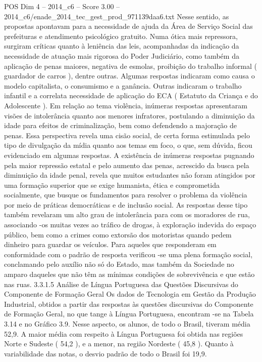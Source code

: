 \begin{textsample}{POS Dim 4 – 2014\_c6 – Score 3.00 – 2014\_c6/enade\_2014\_tec\_gest\_prod\_971139daa6.txt}
Nesse sentido, as propostas apontavam para a necessidade de ajuda da Área de Serviço Social das prefeituras e atendimento psicológico gratuito.
Numa ótica mais repressora, surgiram críticas quanto à leniência das leis, acompanhadas da indicação da necessidade de atuação mais rigorosa do Poder Judiciário, como também da aplicação de penas maiores, negativa de esmolas, proibição do trabalho informal ( guardador de carros ), dentre outras.
Algumas respostas indicaram como causa o modelo capitalista, o consumismo e a ganância.
Outras indicaram o trabalho infantil e a correlata necessidade de aplicação do ECA ( Estatuto da Criança e do Adolescente ).
Em relação ao tema violência, inúmeras respostas apresentaram visões de intolerância quanto aos menores infratores, postulando a diminuição da idade para efeitos de criminalização, bem como defendendo a majoração de penas.
Essa perspectiva revela uma cisão social, de certa forma estimulada pelo tipo de divulgação da mídia quanto aos temas em foco, o que, sem dúvida, ficou evidenciado em algumas respostas.
A existência de inúmeras respostas pugnando pela maior repressão estatal e pelo aumento das penas, acrescido da busca pela diminuição da idade penal, revela que muitos estudantes não foram atingidos por uma formação superior que se exige humanista, ética e comprometida socialmente, que busque os fundamentos para resolver o problema da violência por meio de práticas democráticas e de inclusão social.
As respostas desse tipo também revelaram um alto grau de intolerância para com os moradores de rua, associando -os muitas vezes ao tráfico de drogas, à exploração indevida do espaço público, bem como a crimes como extorsão dos motoristas quando pedem dinheiro para guardar os veículos.
Para aqueles que responderam em conformidade com o padrão de resposta verificou -se uma plena formação social, conclamando pelo auxílio não só do Estado, mas também da Sociedade no amparo daqueles que não têm as mínimas condições de sobrevivência e que estão nas ruas. 3.3.1.5 Análise de Língua Portuguesa das Questões Discursivas do Componente de Formação Geral Os dados de Tecnologia em Gestão da Produção Industrial, obtidos a partir das respostas às questões discursivas do Componente de Formação Geral, no que tange à Língua Portuguesa, encontram -se na Tabela 3.14 e no Gráfico 3.9.
Nesse aspecto, os alunos, de todo o Brasil, tiveram média 52,9.
A maior média com respeito à Língua Portuguesa foi obtida nas regiões Norte e Sudeste ( 54,2 ), e a menor, na região Nordeste ( 45,8 ).
Quanto à variabilidade das notas, o desvio padrão de todo o Brasil foi 19,9.

\end{textsample}
